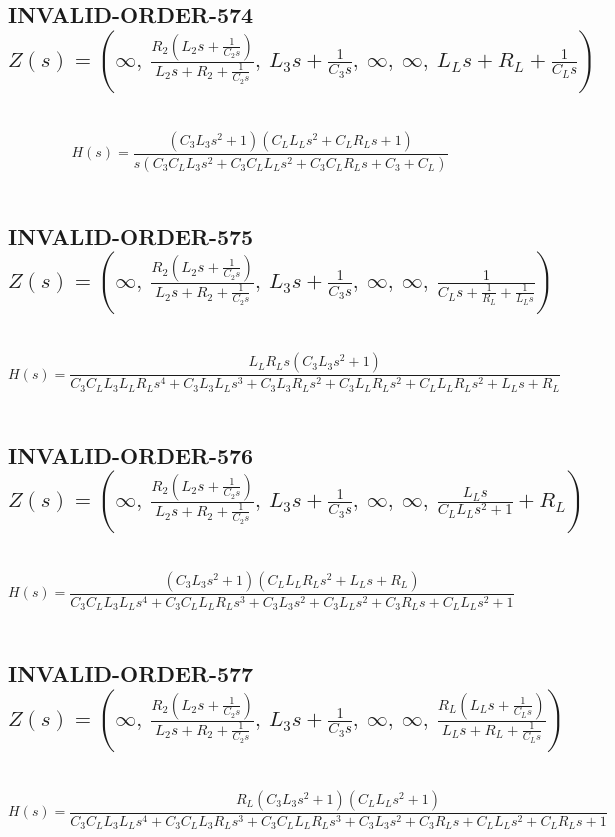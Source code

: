 \documentclass{article}
\begin{document}
\subsection{INVALID-ORDER-574 $Z(s) = \left( \infty, \  \frac{R_{2} \left(L_{2} s + \frac{1}{C_{2} s}\right)}{L_{2} s + R_{2} + \frac{1}{C_{2} s}}, \  L_{3} s + \frac{1}{C_{3} s}, \  \infty, \  \infty, \  L_{L} s + R_{L} + \frac{1}{C_{L} s}\right)$ } \ 
\textbf{\[H(s) = \frac{\left(C_{3} L_{3} s^{2} + 1\right) \left(C_{L} L_{L} s^{2} + C_{L} R_{L} s + 1\right)}{s \left(C_{3} C_{L} L_{3} s^{2} + C_{3} C_{L} L_{L} s^{2} + C_{3} C_{L} R_{L} s + C_{3} + C_{L}\right)}\] } \ 
\subsection{INVALID-ORDER-575 $Z(s) = \left( \infty, \  \frac{R_{2} \left(L_{2} s + \frac{1}{C_{2} s}\right)}{L_{2} s + R_{2} + \frac{1}{C_{2} s}}, \  L_{3} s + \frac{1}{C_{3} s}, \  \infty, \  \infty, \  \frac{1}{C_{L} s + \frac{1}{R_{L}} + \frac{1}{L_{L} s}}\right)$ } \ 
\textbf{\[H(s) = \frac{L_{L} R_{L} s \left(C_{3} L_{3} s^{2} + 1\right)}{C_{3} C_{L} L_{3} L_{L} R_{L} s^{4} + C_{3} L_{3} L_{L} s^{3} + C_{3} L_{3} R_{L} s^{2} + C_{3} L_{L} R_{L} s^{2} + C_{L} L_{L} R_{L} s^{2} + L_{L} s + R_{L}}\] } \ 
\subsection{INVALID-ORDER-576 $Z(s) = \left( \infty, \  \frac{R_{2} \left(L_{2} s + \frac{1}{C_{2} s}\right)}{L_{2} s + R_{2} + \frac{1}{C_{2} s}}, \  L_{3} s + \frac{1}{C_{3} s}, \  \infty, \  \infty, \  \frac{L_{L} s}{C_{L} L_{L} s^{2} + 1} + R_{L}\right)$ } \ 
\textbf{\[H(s) = \frac{\left(C_{3} L_{3} s^{2} + 1\right) \left(C_{L} L_{L} R_{L} s^{2} + L_{L} s + R_{L}\right)}{C_{3} C_{L} L_{3} L_{L} s^{4} + C_{3} C_{L} L_{L} R_{L} s^{3} + C_{3} L_{3} s^{2} + C_{3} L_{L} s^{2} + C_{3} R_{L} s + C_{L} L_{L} s^{2} + 1}\] } \ 
\subsection{INVALID-ORDER-577 $Z(s) = \left( \infty, \  \frac{R_{2} \left(L_{2} s + \frac{1}{C_{2} s}\right)}{L_{2} s + R_{2} + \frac{1}{C_{2} s}}, \  L_{3} s + \frac{1}{C_{3} s}, \  \infty, \  \infty, \  \frac{R_{L} \left(L_{L} s + \frac{1}{C_{L} s}\right)}{L_{L} s + R_{L} + \frac{1}{C_{L} s}}\right)$ } \ 
\textbf{\[H(s) = \frac{R_{L} \left(C_{3} L_{3} s^{2} + 1\right) \left(C_{L} L_{L} s^{2} + 1\right)}{C_{3} C_{L} L_{3} L_{L} s^{4} + C_{3} C_{L} L_{3} R_{L} s^{3} + C_{3} C_{L} L_{L} R_{L} s^{3} + C_{3} L_{3} s^{2} + C_{3} R_{L} s + C_{L} L_{L} s^{2} + C_{L} R_{L} s + 1}\] } \ 
\end{document}

